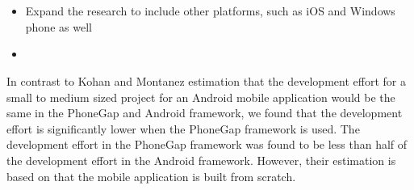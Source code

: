 \\\\
\begin{itemize}
\item Expand the research to include other platforms, such as iOS and Windows phone as well
\item 
\end{itemize}
In contrast to Kohan and Montanez estimation that the development effort for a small to medium sized project for an Android mobile application would be the same in the PhoneGap and Android framework, we found that the development effort is significantly lower when the PhoneGap framework is used. The development effort in the PhoneGap framework was found to be less than half of the development effort in the Android framework. However, their estimation is based on that the mobile application is built from scratch.